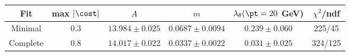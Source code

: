 \begin{tabular}{c|c|c|c|c|c}
Fit & max $|\cost|$ & $A$ & $m$ & $\lambda_\theta(\pt=20$ GeV) & $\chi^2$/ndf \\
\hline
Minimal & $0.3$ & $13.984\pm0.025$ & $0.0687\pm0.0094$ & $0.239\pm0.060$ & 225/45 \\
Complete & $0.8$ & $14.017\pm0.022$ & $0.0337\pm0.0022$ & $0.031\pm0.025$ & 324/125
\end{tabular}
